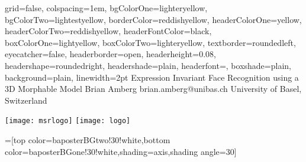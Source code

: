 \documentclass[a0paper,landscape,final]{baposter}
\begin{document}
\begin{poster}{
  grid=false,
  colspacing=1em,
  bgColorOne=lighteryellow,
  bgColorTwo=lightestyellow,
  borderColor=reddishyellow,
  headerColorOne=yellow,
  headerColorTwo=reddishyellow,
  headerFontColor=black,
  boxColorOne=lightyellow,
  boxColorTwo=lighteryellow,
  textborder=roundedleft,
  eyecatcher=false,
  headerborder=open,
  headerheight=0.08\textheight,
  headershape=roundedright,
  headershade=plain,
  headerfont=\Large\textsf, %
  boxshade=plain,
  background=plain,
  linewidth=2pt
  }
  {} %
  {\sf %
  Expression Invariant Face Recognition using a 3D Morphable Model}
  {\sf %
  Brian Amberg\hspace{3em}
  brian.amberg@unibas.ch\hspace{3em}
  University of Basel, Switzerland
  }
  {{\begin{minipage}{16em}
    \hfill
    \texttt{[image: msrlogo]}
    \texttt{[image: logo]}
  \end{minipage}}
  }

  =[top color=baposterBGtwo!30!white,bottom color=baposterBGone!30!white,shading=axis,shading angle=30]

     \newlength{\leftimgwidth}
     \setlength{\leftimgwidth}{0.78em+8.0em}

    \newcommand{\colouredcircle}[1]{%
      \tikz{\useasboundingbox (-0.2em,-0.32em) rectangle(0.2em,0.32em); \draw[draw=black,fill=baposterBGone!80!black!#1!white,line width=0.03em] (0,0) circle(0.18em);}}


\end{poster}
\end{document}
